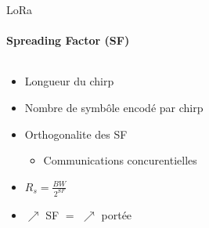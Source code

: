 \begin{frame}{LoRa}
\framesubtitle{Spreading Factor (SF)}
\begin{columns}
  \begin{column}{0.4\textwidth}
    \begin{itemize}
      \item Longueur du chirp
      \item Nombre de symbôle encodé par chirp
      \item Orthogonalite des SF
      \begin{itemize}
        \item Communications concurentielles
      \end{itemize}
      \item  $R_{s} = \frac{BW}{2^{SF}}$
      \item $\nearrow$ SF $=$ $\nearrow$ portée
    \end{itemize}
  \end{column}
  \begin{column}{0.6\textwidth}
    
  \end{column}
\end{columns}
\end{frame}

